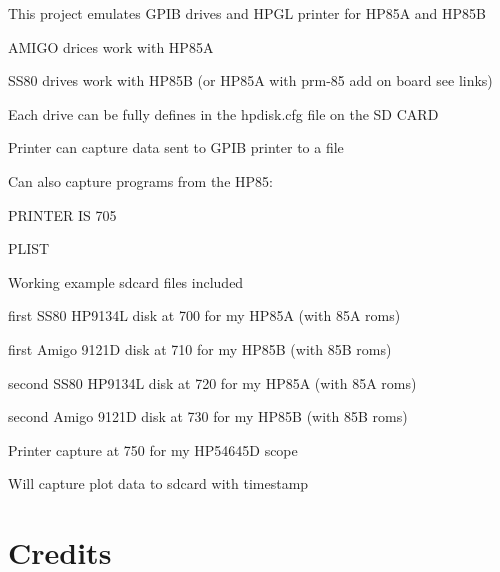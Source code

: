 \begin{DoxyItemize}
\item This project emulates G\+P\+IB drives and H\+P\+GL printer for H\+P85A and H\+P85B
\begin{DoxyItemize}
\item A\+M\+I\+GO drices work with H\+P85A
\item S\+S80 drives work with H\+P85B (or H\+P85A with prm-\/85 add on board see links)
\item Each drive can be fully defines in the hpdisk.\+cfg file on the SD C\+A\+RD
\item Printer can capture data sent to G\+P\+IB printer to a file
\begin{DoxyItemize}
\item Can also capture programs from the H\+P85\+:
\begin{DoxyItemize}
\item P\+R\+I\+N\+T\+ER IS 705
\item P\+L\+I\+ST
\end{DoxyItemize}
\end{DoxyItemize}
\item Working example sdcard files included
\begin{DoxyItemize}
\item first S\+S80 H\+P9134L disk at 700 for my H\+P85A (with 85A roms)
\item first Amigo 9121D disk at 710 for my H\+P85B (with 85B roms)
\item second S\+S80 H\+P9134L disk at 720 for my H\+P85A (with 85A roms)
\item second Amigo 9121D disk at 730 for my H\+P85B (with 85B roms)
\item Printer capture at 750 for my H\+P54645D scope
\begin{DoxyItemize}
\item Will capture plot data to sdcard with timestamp 


\end{DoxyItemize}
\end{DoxyItemize}
\end{DoxyItemize}
\end{DoxyItemize}

\section*{Credits}

